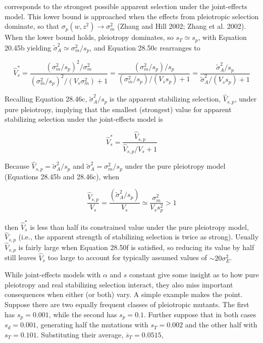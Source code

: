 \documentclass{article}
\begin{document}
corresponds to the strongest possible apparent selection under the joint-effects model. This lower bound is approached when the effects from pleiotropic selection dominate, so that  $ \sigma_p(w, z^2) \to \sigma_m^2 $ (Zhang and Hill 2002; Zhang et al. 2002). When the lower bound holds, pleiotropy dominates, so  $ s_T \simeq s_p $, with Equation 20.45b yielding  $ \widetilde{\sigma}_A^2 \simeq \sigma_m^2 / s_p $, and Equation 28.50c rearranges to

\begin{equation}
\widehat{V}_{s}^{*}=\frac{(\sigma_{m}^{2}/s_{p})^{2}/\sigma_{m}^{2}}{(\sigma_{m}^{2}/s_{p})^{2}/(V_{s}\sigma_{m}^{2})+1}=\frac{(\sigma_{m}^{2}/s_{p})/s_{p}}{(\sigma_{m}^{2}/s_{p})/(V_{s}s_{p})+1}=\frac{\widetilde{\sigma}_{A}^{2}/s_{p}}{\widetilde{\sigma}_{A}^{2}/(V_{s}s_{p})+1}
\tag{28.50d}
\label{eq:28_50d}
\end{equation}

Recalling Equation 28.46c,  $ \widetilde{\sigma}_{A}^{2}/s_{p} $ is the apparent stabilizing selection,  $ \widehat{V}_{s,p} $, under pure pleiotropy, implying that the smallest (strongest) value for apparent stabilizing selection under the joint-effects model is

\begin{equation}
\widehat{V}_{s}^{*}=\frac{\widehat{V}_{s,p}}{\widehat{V}_{s,p}/V_{s}+1}
\tag{28.50e}
\label{eq:28_50e}
\end{equation}

Because  $ \widehat{V}_{s,p} = \widetilde{\sigma}_{A}^{2}/s_{p} $ and  $ \widetilde{\sigma}_{A}^{2} = \sigma_{m}^{2}/s_{p} $ under the pure pleiotropy model (Equations 28.45b and 28.46c), when

\begin{equation}
\frac{\widehat{V}_{s,p}}{V_{s}}=\frac{\left(\widetilde{\sigma}_{A}^{2}/s_{p}\right)}{V_{s}}\simeq\frac{\sigma_{m}^{2}}{V_{s}s_{p}^{2}}>1
\tag{28.50f}
\label{eq:28_50f}
\end{equation}

then  $ \widehat{V}_s^* $ is less than half its constrained value under the pure pleiotropy model,  $ \widehat{V}_{s,p} $ (i.e., the apparent strength of stabilizing selection is twice as strong). Usually  $ \widehat{V}_{s,p} $ is fairly large when Equation 28.50f is satisfied, so reducing its value by half still leaves  $ \widehat{V}_s $ too large to account for typically assumed values of  $ \sim20\sigma_E^2 $.

While joint-effects models with $\alpha$ and $s$ constant give some insight as to how pure pleiotropy and real stabilizing selection interact, they also miss important consequences when either (or both) vary. A simple example makes the point. Suppose there are two equally frequent classes of pleiotropic mutants. The first has $s_p = 0.001$, while the second has $s_p = 0.1$. Further suppose that in both cases $s_d = 0.001$, generating half the mutations with $s_T = 0.002$ and the other half with $s_T = 0.101$. Substituting their average, $\overline{s}_T = 0.0515$,
\end{document}

